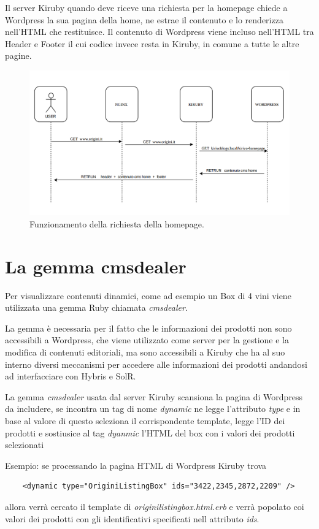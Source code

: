 \newpage

Il server Kiruby quando deve riceve una richiesta per la homepage chiede a Wordpress la sua pagina della home, ne estrae
il contenuto e lo renderizza nell'HTML che restituisce. Il contenuto di Wordpress viene incluso nell'HTML tra Header e Footer il cui codice invece resta in Kiruby, in comune a tutte le altre pagine.


\begin{figure}
  \includegraphics[width=\textwidth]{figure/homeseq.png}
  \caption{Funzionamento della richiesta della homepage.}
  \label{fig:homeseq}
\end{figure}



\section{La gemma cmsdealer}
Per visualizzare contenuti dinamici, come ad esempio un Box di 4 vini viene utilizzata
una gemma Ruby chiamata \emph{cmsdealer}.

La gemma è necessaria per il fatto che le informazioni dei prodotti non sono accessibili a Wordpress, che viene utilizzato
come server per la gestione e la modifica di contenuti editoriali, ma sono accessibili a Kiruby che ha al suo interno diversi
meccanismi per accedere alle informazioni dei prodotti andandosi ad interfacciare con Hybris e SolR.

La gemma \emph{cmsdealer} usata dal server Kiruby scansiona la pagina di Wordpress da includere,
se incontra un tag di nome \emph{dynamic} ne legge l'attributo \emph{type} e in base al valore di questo
seleziona il corrispondente template, legge l'ID dei prodotti e sostiusice al tag \emph{dyanmic} l'HTML del box con
i valori dei prodotti selezionati

Esempio: se processando la pagina HTML di Wordpress Kiruby trova
\begin{verbatim}
	<dynamic type="OriginiListingBox" ids="3422,2345,2872,2209" />
\end{verbatim}
allora verrà cercato il template di \emph{originilistingbox.html.erb} e verrà popolato
coi valori dei prodotti con gli identificativi specificati nell attributo \emph{ids}.

